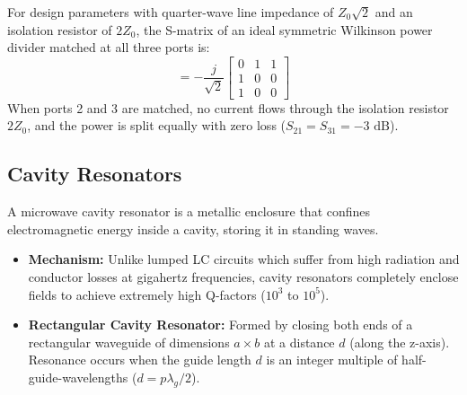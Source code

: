 \documentclass[12pt,a4paper]{article}
\begin{document}
\begin{tcolorbox}[formulabox, title={\textbf{Wilkinson Power Divider S-Matrix}}]
For design parameters with quarter-wave line impedance of $Z_0\sqrt{2}$ and an isolation resistor of $2Z_0$, the S-matrix of an ideal symmetric Wilkinson power divider matched at all three ports is:
\begin{equation}
  [S] = -\frac{j}{\sqrt{2}} \begin{bmatrix} 0 & 1 & 1 \\ 1 & 0 & 0 \\ 1 & 0 & 0 \end{bmatrix}
\end{equation}
When ports 2 and 3 are matched, no current flows through the isolation resistor $2Z_0$, and the power is split equally with zero loss ($S_{21} = S_{31} = -3\text{ dB}$).
\end{tcolorbox}

\subsection{Cavity Resonators}
A microwave cavity resonator is a metallic enclosure that confines electromagnetic energy inside a cavity, storing it in standing waves.
\begin{itemize}[leftmargin=*, itemsep=3pt]
  \item \textbf{Mechanism:} Unlike lumped LC circuits which suffer from high radiation and conductor losses at gigahertz frequencies, cavity resonators completely enclose fields to achieve extremely high Q-factors ($10^3$ to $10^5$).
  \item \textbf{Rectangular Cavity Resonator:} Formed by closing both ends of a rectangular waveguide of dimensions $a \times b$ at a distance $d$ (along the z-axis). Resonance occurs when the guide length $d$ is an integer multiple of half-guide-wavelengths ($d = p \lambda_g / 2$).
\end{itemize}
\end{document}
